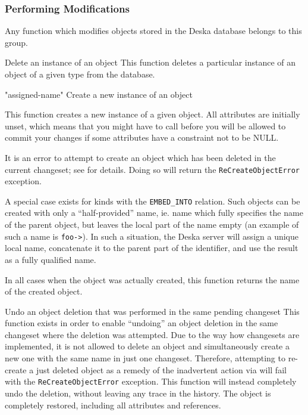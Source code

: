\documentclass{article}
\begin{document}
\subsubsection{Performing Modifications}
\label{sec:api-group-data-modification}

Any function which modifies objects stored in the Deska database belongs to this group.

    {}
    {Delete an instance of an object}
    {This function deletes a particular instance of an object of a given type from the database.}

    {"assigned-name"}
    {Create a new instance of an object}
    {This function creates a new instance of a given object.  All attributes are initially unset, which means that you
    might have to call  before you will be allowed to commit your changes if some attributes
    have a constraint not to be NULL.

    It is an error to attempt to create an object which has been deleted in the current changeset; see
     for details.  Doing so will return the {\tt ReCreateObjectError} exception.

    A special case exists for kinds with the {\tt EMBED\_INTO} relation. Such objects can be created with only a
    ``half-provided'' name, ie. name which fully specifies the name of the parent object, but leaves the local part of
    the name empty (an example of such a name is {\tt foo->}).  In such a situation, the Deska server will assign a
    unique local name, concatenate it to the parent part of the identifier, and use the result as a fully qualified
    name.

    In all cases when the object was actually created, this function returns the name of the created object.}

    {}
    {Undo an object deletion that was performed in the same pending changeset}
    {This function exists in order to enable ``undoing'' an object deletion in the same changeset where the deletion was
    attempted.  Due to the way how changesets are implemented, it is not allowed to delete an object and simultaneously
    create a new one with the same name in just one changeset.  Therefore, attempting to re-create a just deleted object
    as a remedy of the inadvertent action via  will fail with the {\tt ReCreateObjectError}
    exception.  This function will instead completely undo the deletion, without leaving any trace in the history.  The
    object is completely restored, including all attributes and references.}
\end{document}
